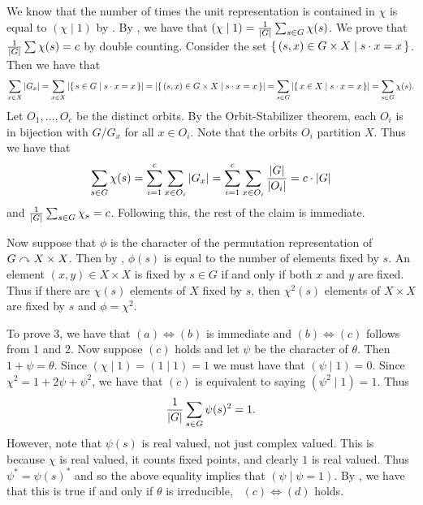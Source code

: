 \documentclass[letterpaper, 11pt, oneside]{book}
\begin{document}
\begin{pf}
  We know that the number of times the unit representation is contained in $\chi$ is equal to $(\chi \mid 1)$ by .
  By , we have that $(\chi \mid 1) = \frac{1}{\abs{G}} \sum_{s \in G} \chi(s)$.
  We prove that $\frac{1}{\abs{G}} \sum \chi(s) = c$ by double counting.
  Consider the set $\set{(s, x) \in G \times X | s \cdot x = x}$.
  Then we have that
  \[
    \sum_{x \in X} \abs{G_{x}} = \sum_{x \in X} \abs{\set{s \in G | s \cdot x = x}} = \abs{\set{(s, x) \in G \times X | s \cdot x = x}} = \sum_{s \in G} \abs{\set{x \in X | s \cdot x = x}} = \sum_{s \in G} \chi(s).
  \]
  Let $O_{1}, \ldots, O_{c}$ be the distinct orbits.
  By the Orbit-Stabilizer theorem, each $O_{i}$ is in bijection with $G / G_{x}$ for all $x \in O_{i}$.
  Note that the orbits $O_{i}$ partition $X$.
  Thus we have that
  \[
    \sum_{s \in G} \chi(s) = \sum_{i = 1}^{c} \sum_{x \in O_{i}} \abs{G_{x}} = \sum_{i = 1}^{c} \sum_{x \in O_{i}} \frac{\abs{G}}{\abs{O_{i}}} = c \cdot \abs{G}
  \]
  and $\frac{1}{\abs{G}} \sum_{s \in G} \chi_{s} = c$.
  Following this, the rest of the claim is immediate.

  Now suppose that $\phi$ is the character of the permutation representation of $G \curvearrowright X \times X$.
  Then by , $\phi(s)$ is equal to the number of elements fixed by $s$.
  An element $(x, y) \in X \times X$ is fixed by $s \in G$ if and only if both $x$ and $y$ are fixed.
  Thus if there are $\chi(s)$ elements of $X$ fixed by $s$, then $\chi^{2}(s)$ elements of $X \times X$ are fixed by $s$ and $\phi = \chi^{2}$.

  To prove 3, we have that $(a) \iff (b)$ is immediate and $(b) \iff (c)$ follows from 1 and 2.
  Now suppose $(c)$ holds and let $\psi$ be the character of $\theta$.
  Then $1 + \psi = \theta$.
  Since $(\chi \mid 1) = (1 \mid 1) = 1$ we must have that $(\psi \mid 1) = 0$.
  Since $\chi^{2} = 1 + 2\psi + \psi^{2}$, we have that $(c)$ is equivalent to saying $(\psi^{2} \mid 1) = 1$.
  Thus
  \[
    \frac{1}{\abs{G}} \sum_{s \in G} \psi(s)^{2} = 1.
  \]
  However, note that $\psi(s)$ is real valued, not just complex valued.
  This is because $\chi$ is real valued, it counts fixed points, and clearly $1$ is real valued.
  Thus $\psi^{*} = \psi(s)^{*}$ and so the above equality implies that $(\psi \mid \psi = 1)$.
  By , we have that this is true if and only if $\theta$ is irreducible, \ie\ $(c) \iff (d)$ holds.
\end{pf}
\end{document}
